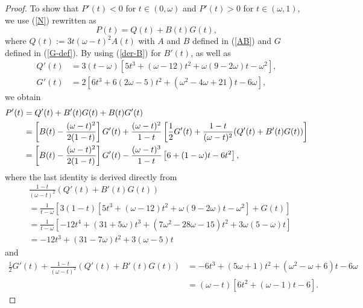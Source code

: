 \documentclass[10pt,a4paper]{amsart}
\begin{document}
	\begin{proof}
To show that $P'(t) < 0$ for $t \in (0,\omega)$ and $P'(t) > 0$ for $t \in (\omega, 1)$, we use (\ref{N}) rewritten as 
		\begin{equation*}
		P(t) = Q(t) + B(t) G(t), 
		\end{equation*}
where $Q(t) := 3 t (\omega - t)^2 A(t)$ with $A$ and $B$ defined in (\ref{AB}) and $G$ defined in (\ref{G-def}). By using (\ref{der-B}) for $B'(t)$, as well as  
\begin{align*}
Q'(t) &=3(t-\omega) \left[ 5t^3+(\omega-12)t^2+ \omega (9-2\omega) t-\omega^2 \right], \\
G'(t) &= 2 \left[ 6 t^3 + 6 (2\omega - 5) t^2 + (\omega^2 - 4 \omega + 21) t - 6\omega \right],  
\end{align*}
we obtain 	
\begin{align}
P'(t) &= Q'(t) + B'(t)G(t) + B(t)G'(t)  \notag \\
&= \left[ B(t) - \frac{(\omega-t)^2}{2(1-t)} \right] G'(t) + \frac{(\omega-t)^2}{1-t} \left[ \frac{1}{2} G'(t) + \frac{1-t}{(\omega - t)^2} (Q'(t) + B'(t) G(t)) \right] \notag \\
&= \left[ B(t) - \frac{(\omega-t)^2}{2(1-t)} \right ]G'(t) -\frac{(\omega-t)^3}{1-t} \left[ 6 + (1-\omega) t - 6t^2 \right], \label{Pprime}
\end{align}
where the last identity is derived directly from 
\begin{align*}
& \frac{1-t}{(\omega - t)^2} (Q'(t) + B'(t) G(t)) \\
&= 
\frac{1}{t - \omega} \left[ 3 (1-t) \left[ 5t^3+(\omega-12)t^2+ \omega (9-2\omega) t-\omega^2 \right] + G(t) \right]  \\
&= \frac{1}{t - \omega} \left[ -12 t^4 + (31 + 5 \omega) t^3 + (7 \omega^2 - 28 \omega - 15) t^2 + 3 \omega (5 - \omega) t \right] \\
&= -12 t^3 + (31 - 7 \omega) t^2 + 3 (\omega - 5) t 
\end{align*}
and
\begin{align*}
\frac{1}{2} G'(t) + \frac{1-t}{(\omega - t)^2} (Q'(t) + B'(t) G(t))
&= -6 t^3 + (5 \omega + 1) t^2 + (\omega^2 - \omega + 6) t - 6\omega \\
&= (\omega - t) \left[ 6 t^2 + (\omega - 1) t - 6 \right].
\end{align*}


\end{proof}
\end{document}
